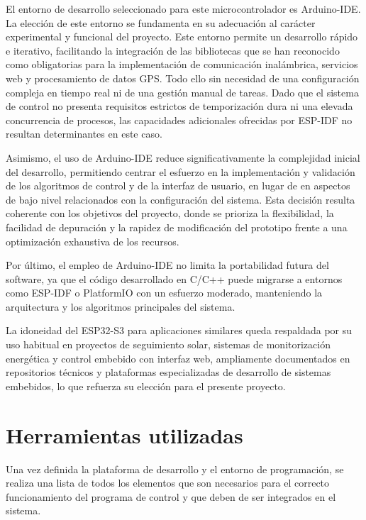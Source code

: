 El entorno de desarrollo seleccionado para este microcontrolador es Arduino-IDE. La elección de este entorno se fundamenta en su adecuación al carácter experimental y funcional del proyecto. Este entorno permite un desarrollo rápido e iterativo, facilitando la integración de las bibliotecas que se han reconocido como obligatorias para la implementación de comunicación inalámbrica, servicios web y procesamiento de datos GPS. Todo ello sin necesidad de una configuración compleja en tiempo real ni de una gestión manual de tareas. Dado que el sistema de control no presenta requisitos estrictos de temporización dura ni una elevada concurrencia de procesos, las capacidades adicionales ofrecidas por ESP-IDF no resultan determinantes en este caso.

Asimismo, el uso de Arduino-IDE reduce significativamente la complejidad inicial del desarrollo, permitiendo centrar el esfuerzo en la implementación y validación de los algoritmos de control y de la interfaz de usuario, en lugar de en aspectos de bajo nivel relacionados con la configuración del sistema. Esta decisión resulta coherente con los objetivos del proyecto, donde se prioriza la flexibilidad, la facilidad de depuración y la rapidez de modificación del prototipo frente a una optimización exhaustiva de los recursos.

Por último, el empleo de Arduino-IDE no limita la portabilidad futura del software, ya que el código desarrollado en C/C++ puede migrarse a entornos como ESP-IDF o PlatformIO con un esfuerzo moderado, manteniendo la arquitectura y los algoritmos principales del sistema.

La idoneidad del ESP32-S3 para aplicaciones similares queda respaldada por su uso habitual en proyectos de seguimiento solar, sistemas de monitorización energética y control embebido con interfaz web, ampliamente documentados en repositorios técnicos y plataformas especializadas de desarrollo de sistemas embebidos, lo que refuerza su elección para el presente proyecto.


\section{Herramientas utilizadas}\label{sec:herramientas}
Una vez definida la plataforma de desarrollo y el entorno de programación, se realiza una lista de todos los elementos que son necesarios para el correcto funcionamiento del programa de control y que deben de ser integrados en el sistema.
 
